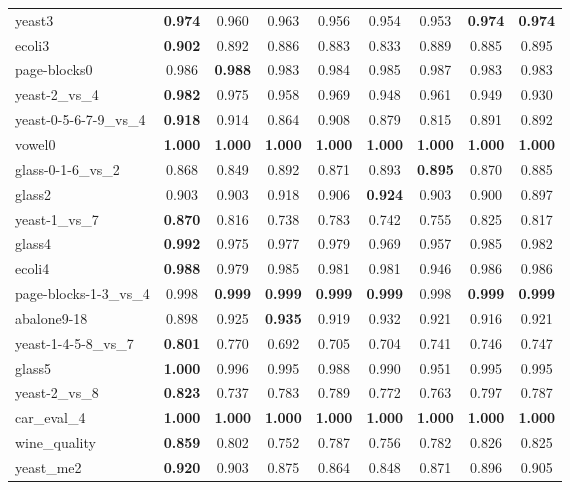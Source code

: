\begin{table}[!htbp]
{\begin{tabular}{lcccccccc}
			yeast3 & \textbf{0.974} & 0.960 & 0.963 & 0.956 & 0.954 & 0.953 & \textbf{0.974} & \textbf{0.974} \\
			ecoli3 & \textbf{0.902} & 0.892 & 0.886 & 0.883 & 0.833 & 0.889 & 0.885 & 0.895 \\
			page-blocks0 & 0.986 & \textbf{0.988} & 0.983 & 0.984 & 0.985 & 0.987 & 0.983 & 0.983 \\
			yeast-2\_vs\_4 & \textbf{0.982} & 0.975 & 0.958 & 0.969 & 0.948 & 0.961 & 0.949 & 0.930 \\
			yeast-0-5-6-7-9\_vs\_4 & \textbf{0.918} & 0.914 & 0.864 & 0.908 & 0.879 & 0.815 & 0.891 & 0.892 \\
			vowel0 & \textbf{1.000} & \textbf{1.000} & \textbf{1.000} & \textbf{1.000} & \textbf{1.000} & \textbf{1.000} & \textbf{1.000} & \textbf{1.000} \\
			glass-0-1-6\_vs\_2 & 0.868 & 0.849 & 0.892 & 0.871 & 0.893 & \textbf{0.895} & 0.870 & 0.885 \\
			glass2 & 0.903 & 0.903 & 0.918 & 0.906 & \textbf{0.924} & 0.903 & 0.900 & 0.897 \\
			yeast-1\_vs\_7 & \textbf{0.870} & 0.816 & 0.738 & 0.783 & 0.742 & 0.755 & 0.825 & 0.817 \\
			glass4 & \textbf{0.992} & 0.975 & 0.977 & 0.979 & 0.969 & 0.957 & 0.985 & 0.982 \\
			ecoli4 & \textbf{0.988} & 0.979 & 0.985 & 0.981 & 0.981 & 0.946 & 0.986 & 0.986 \\
			page-blocks-1-3\_vs\_4 & 0.998 & \textbf{0.999} & \textbf{0.999} & \textbf{0.999} & \textbf{0.999} & 0.998 & \textbf{0.999} & \textbf{0.999} \\
			abalone9-18 & 0.898 & 0.925 & \textbf{0.935} & 0.919 & 0.932 & 0.921 & 0.916 & 0.921 \\
			yeast-1-4-5-8\_vs\_7 & \textbf{0.801} & 0.770 & 0.692 & 0.705 & 0.704 & 0.741 & 0.746 & 0.747 \\
			glass5 & \textbf{1.000} & 0.996 & 0.995 & 0.988 & 0.990 & 0.951 & 0.995 & 0.995 \\
			yeast-2\_vs\_8 & \textbf{0.823} & 0.737 & 0.783 & 0.789 & 0.772 & 0.763 & 0.797 & 0.787 \\
			car\_eval\_4 & \textbf{1.000} & \textbf{1.000} & \textbf{1.000} & \textbf{1.000} & \textbf{1.000} & \textbf{1.000} & \textbf{1.000} & \textbf{1.000} \\
			wine\_quality & \textbf{0.859} & 0.802 & 0.752 & 0.787 & 0.756 & 0.782 & 0.826 & 0.825 \\
			yeast\_me2 & \textbf{0.920} & 0.903 & 0.875 & 0.864 & 0.848 & 0.871 & 0.896 & 0.905 \\

\end{tabular}}
\end{table}
